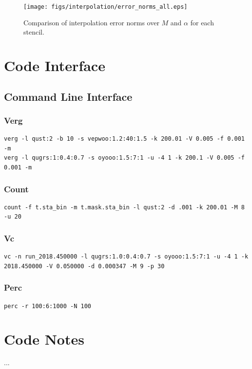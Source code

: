 \documentclass{report}
\begin{document}
\begin{figure}
  \begin{center}
    \texttt{[image: figs/interpolation/error\_norms\_all.eps]}
    \caption{Comparison of interpolation error norms over $M$ and $\alpha$ for each stencil.}
    \label{fig:errors_all}
  \end{center}
\end{figure}

\chapter{Code Interface}
\label{sec:api}
\section{Command Line Interface}
\subsection{Verg}
\begin{verbatim}
verg -l qust:2 -b 10 -s vepwoo:1.2:40:1.5 -k 200.01 -V 0.005 -f 0.001 -m
verg -l qugrs:1:0.4:0.7 -s oyooo:1.5:7:1 -u -4 1 -k 200.1 -V 0.005 -f 0.001 -m
\end{verbatim}

\subsection{Count}
\begin{verbatim}
count -f t.sta_bin -m t.mask.sta_bin -l qust:2 -d .001 -k 200.01 -M 8 -u 20
\end{verbatim}

\subsection{Vc}
\begin{verbatim}
vc -n run_2018.450000 -l qugrs:1.0:0.4:0.7 -s oyooo:1.5:7:1 -u -4 1 -k 2018.450000 -V 0.050000 -d 0.000347 -M 9 -p 30
\end{verbatim}

\subsection{Perc}
\begin{verbatim}
perc -r 100:6:1000 -N 100
\end{verbatim}


\chapter{Code Notes}
...




\end{document}
